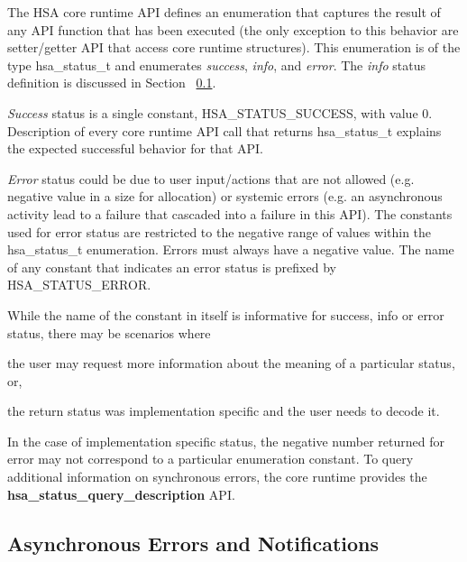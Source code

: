 \documentclass[draft]{book}
\newcommand{\reffun}[1]{\textbf{#1}}
\newcommand{\reftyp}[1]{#1}
\newcommand{\refenu}[1]{\reftyp{#1}}
\begin{document}
The HSA core runtime API defines an enumeration that captures the result of any
API function that has been executed (the only exception to this behavior are
setter/getter API that access core runtime structures). This enumeration is of
the type \reftyp{hsa_status_t} and enumerates \textit{success}, \textit{info},
and \textit{error}. The \textit{info} status definition is discussed in Section
~\ref{asyncerror}.

\textit{Success} status is a single constant, \refenu{HSA_STATUS_SUCCESS},
with value 0. Description of every core runtime API call that returns
\reftyp{hsa_status_t} explains the expected successful behavior for that API.

\textit{Error} status could be due to user input/actions that are not allowed
(e.g. negative value in a size for allocation) or systemic errors (e.g. an
asynchronous activity lead to a failure that cascaded into a failure in this
API). The constants used for error status are restricted to the negative range
of values within the \reftyp{hsa_status_t} enumeration. Errors must always
have a negative value. The name of any constant that indicates an error status
is prefixed by \refenu{HSA_STATUS_ERROR}.

While the name of the constant in itself is informative for success, info or
error status, there may be scenarios where
\begin{inparaenum}[(i)] \item the user may request more information about the
  meaning of a particular status, or, \item the return status was implementation
  specific and the user needs to decode it.
\end{inparaenum} In the case of implementation specific status, the negative
number returned for error may not correspond to a particular enumeration
constant. To query additional information on synchronous errors, the core
runtime provides the \reffun{hsa_status_query_description} API.

\hypertarget{asyncerror}{}\subsection{Asynchronous Errors and
Notifications}\label{asyncerror}
\end{document}
